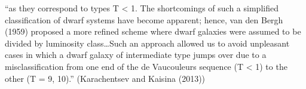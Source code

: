 \documentclass[
]{article}
\begin{document}
``as they correspond to types T \textless{} 1. The shortcomings of such
a simplified classification of dwarf systems have become apparent;
hence, van den Bergh (1959) proposed a more refined scheme where dwarf
galaxies were assumed to be divided by luminosity class\ldots Such an
approach allowed us to avoid unpleasant cases in which a dwarf galaxy of
intermediate type jumps over due to a misclassification from one end of
the de Vaucouleurs sequence (T \textless{} 1) to the other (T = 9,
10).'' (Karachentsev and Kaisina (2013))

\begin{figure}

\begin{minipage}{0.50\linewidth}



\end{minipage}%
%
\begin{minipage}{0.50\linewidth}

\end{minipage}
\end{figure}
\end{document}
